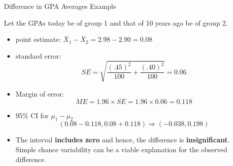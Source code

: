 \documentclass[14pt]{beamer}\usepackage[]{graphicx}\usepackage[]{color}
\begin{document}
\begin{frame}[fragile]{Difference in GPA Averages Example}

{\footnotesize{
Let the GPAs today be of group 1 and that of 10 years ago be of group 2.

\begin{itemize}
\item point estimate: $\bar{X}_1 - \bar{X}_2 = 2.98 - 2.90 = 0.08$

\item standard error:
\begin{equation*}
SE = \sqrt{ \frac{(.45)^2}{100} + \frac{(.40)^2}{100}} = 0.06
\end{equation*}

\item Margin of error:
\begin{equation*}
ME = 1.96 \times SE = 1.96 \times 0.06 = 0.118
\end{equation*}

\item 95\% CI for $\mu_1 - \mu_2$
\begin{equation*}
( 0.08 - 0.118, 0.08 + 0.118) \Rightarrow (-0.038, 0.198)
\end{equation*}

\item The interval \textbf{includes zero} and hence, the difference is \textbf{insignificant}.  Simple chance variability can be a viable explanation for the observed  difference.
\end{itemize}
}}
\end{frame}
\end{document}
